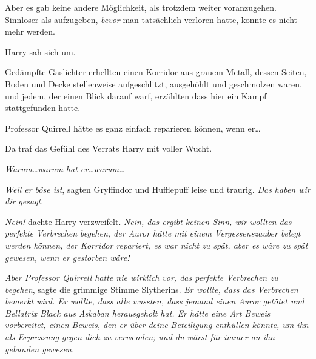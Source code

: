 Aber es gab keine andere Möglichkeit, als trotzdem weiter voranzugehen. Sinnloser als aufzugeben, \emph{bevor} man tatsächlich verloren hatte, konnte es nicht mehr werden.

Harry sah sich um.

Gedämpfte Gaslichter erhellten einen Korridor aus grauem Metall, dessen Seiten, Boden und Decke stellenweise aufgeschlitzt, ausgehöhlt und geschmolzen waren, und jedem, der einen Blick darauf warf, erzählten dass hier ein Kampf stattgefunden hatte.

Professor Quirrell hätte es ganz einfach reparieren können, wenn er…

Da traf das Gefühl des Verrats Harry mit voller Wucht.

\emph{Warum…warum hat er…warum…}

\emph{Weil er böse ist}, sagten Gryffindor und Hufflepuff leise und traurig. \emph{Das haben wir dir gesagt}.

\emph{Nein!} dachte Harry verzweifelt. \emph{Nein, das ergibt keinen Sinn, wir wollten das perfekte Verbrechen begehen, der Auror hätte mit einem Vergessenszauber belegt werden können, der Korridor repariert, es war nicht zu spät, aber es wäre zu spät gewesen, wenn er gestorben wäre!}

\emph{Aber Professor Quirrell hatte nie wirklich vor, das perfekte Verbrechen zu begehen}, sagte die grimmige Stimme Slytherins. \emph{Er wollte, dass das Verbrechen bemerkt wird. Er wollte, dass alle wussten, dass jemand einen Auror getötet und Bellatrix Black aus Askaban herausgeholt hat. Er hätte eine Art Beweis vorbereitet, einen Beweis, den er über deine Beteiligung enthüllen könnte, um ihn als Erpressung gegen dich zu verwenden; und du wärst für immer an ihn gebunden gewesen.}

